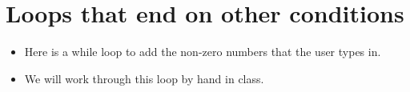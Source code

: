 \documentclass[letterpaper,10pt,english]{sphinxmanual}
\begin{document}
\section{Loops that end on other conditions}
\label{\detokenize{lecture_notes/lec09_loops1_while:loops-that-end-on-other-conditions}}\begin{itemize}
\item {} 
Here is a while loop to add the non-zero numbers that the user types
in.

%
\begin{sphinxVerbatim}[commandchars=\\\{\}]
  
  

  
       
       
          
          

\end{sphinxVerbatim}

\item {} 
We will work through this loop by hand in class.

\end{itemize}
\end{document}
